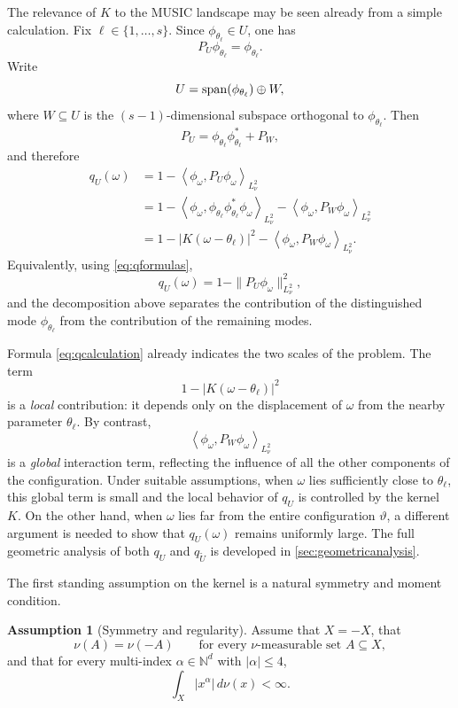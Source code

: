\documentclass[11pt]{article}
\theoremstyle{definition}
\newtheorem{assumption}{Assumption}
\numberwithin{theorem}{section}
\numberwithin{lemma}{section}
\numberwithin{equation}{section}
\def\N{\mathbb{N}}
\renewcommand{\subset}{\subseteq}
\renewcommand{\tilde}{\widetilde}
\newcommand{\spann}{{\rm span}}
\newcommand{\inner}[1]{{\left\langle#1\right\rangle}}
\numberwithin{equation}{section}
\begin{document}
The relevance of $K$ to the MUSIC landscape may be seen already from a simple calculation. 
Fix $\ell\in\{1,\dots,s\}$. Since $\phi_{\theta_\ell}\in U$, one has
\[
P_U\phi_{\theta_\ell}=\phi_{\theta_\ell}.
\]
Write
\[
U=\spann(\phi_{\theta_\ell})\oplus W,
\]
where $W\subset U$ is the $(s-1)$-dimensional subspace orthogonal to $\phi_{\theta_\ell}$. 
Then
\[
P_U=\phi_{\theta_\ell}\phi_{\theta_\ell}^*+P_W,
\]
and therefore
\begin{equation}
\label{eq:qcalculation}
\begin{aligned}
q_U(\omega)
&=1-\inner{\phi_\omega,P_U\phi_\omega}_{L^2_\nu} \\
&=1-\inner{\phi_\omega,\phi_{\theta_\ell}\phi_{\theta_\ell}^*\phi_\omega}_{L^2_\nu}
    -\inner{\phi_\omega,P_W\phi_\omega}_{L^2_\nu} \\
&=1-|K(\omega-\theta_\ell)|^2-\inner{\phi_\omega,P_W\phi_\omega}_{L^2_\nu}.
\end{aligned}
\end{equation}
Equivalently, using \eqref{eq:qformulas},
\[
q_U(\omega)
=
1-\|P_U\phi_\omega\|_{L^2_\nu}^2,
\]
and the decomposition above separates the contribution of the distinguished mode $\phi_{\theta_\ell}$ from the contribution of the remaining modes.

Formula \eqref{eq:qcalculation} already indicates the two scales of the problem. The term
\[
1-|K(\omega-\theta_\ell)|^2
\]
is a \emph{local} contribution: it depends only on the displacement of $\omega$ from the nearby parameter $\theta_\ell$. By contrast,
\[
\inner{\phi_\omega,P_W\phi_\omega}_{L^2_\nu}
\]
is a \emph{global} interaction term, reflecting the influence of all the other components of the configuration. Under suitable assumptions, when $\omega$ lies sufficiently close to $\theta_\ell$, this global term is small and the local behavior of $q_U$ is controlled by the kernel $K$. On the other hand, when $\omega$ lies far from the entire configuration $\vartheta$, a different argument is needed to show that $q_U(\omega)$ remains uniformly large. The full geometric analysis of both $q_U$ and $q_{\tilde U}$ is developed in \cref{sec:geometricanalysis}.

The first standing assumption on the kernel is a natural symmetry and moment condition.

\begin{assumption}[Symmetry and regularity]
\label{assump:symmetry}
Assume that $X=-X$, that
\[
\nu(A)=\nu(-A)
\qquad\text{for every $\nu$-measurable set } A\subset X,
\]
and that for every multi-index $\alpha\in\N^d$ with $|\alpha|\le 4$,
\begin{equation}
\label{eq:moment}
\int_X |x^\alpha|\,d\nu(x)<\infty.
\end{equation}
\end{assumption}
\end{document}
